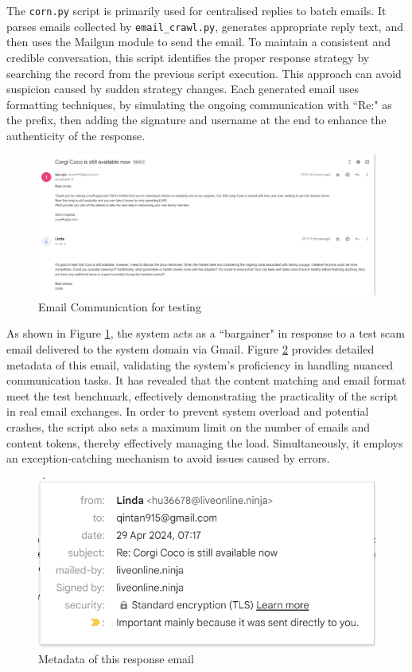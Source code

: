 \documentclass[ oneside,%
                    author={Cassie Qing Tang},
                    degree={BSc},
                     title={An Automated Response System for Disrupting Online Pet Scamming \\ },
                    subtitle={ }]{dissertation}
\begin{document}
The \texttt{corn.py} script is primarily used for centralised replies to batch emails. It parses emails collected by \texttt{email\_crawl.py}, generates appropriate reply text, and then uses the Mailgun module to send the email. To maintain a consistent and credible conversation, this script identifies the proper response strategy by searching the record from the previous script execution. This approach can avoid suspicion caused by sudden strategy changes. Each generated email uses formatting techniques, by simulating the ongoing communication with ``Re:" as the prefix, then adding the signature and username at the end to enhance the authenticity of the response.
\begin{figure}[H]
\centering
\includegraphics[width=\linewidth, height=0.25\textheight]{pic/figure5.png}
\caption{Email Communication for testing}
\label{fig:pic5}
\end{figure}

As shown in Figure \ref{fig:pic5}, the system acts as a ``bargainer" in response to a test scam email delivered to the system domain via Gmail. Figure \ref{fig:pic6} provides detailed metadata of this email, validating the system's proficiency in handling nuanced communication tasks. It has revealed that the content matching and email format meet the test benchmark, effectively demonstrating the practicality of the script in real email exchanges. In order to prevent system overload and potential crashes, the script also sets a maximum limit on the number of emails and content tokens, thereby effectively managing the load. Simultaneously, it employs an exception-catching mechanism to avoid issues caused by errors.
\begin{figure}[H]
\centering
\includegraphics[width=0.4\linewidth]{pic/figure6.png}
\caption{Metadata of this response email}
\label{fig:pic6}
\end{figure}
\end{document}
